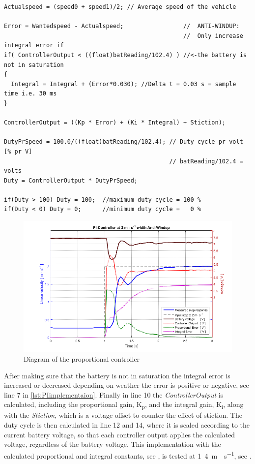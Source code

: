 %
\begin{lstlisting}
Actualspeed = (speed0 + speed1)/2; // Average speed of the vehicle

Error = Wantedspeed - Actualspeed;                 //  ANTI-WINDUP:
                                                   //  Only increase integral error if
if( ControllerOutput < ((float)batReading/102.4) ) //<-the battery is not in saturation
{
  Integral = Integral + (Error*0.030); //Delta t = 0.03 s = sample time i.e. 30 ms
}

ControllerOutput = ((Kp * Error) + (Ki * Integral) + Stiction);

DutyPrSpeed = 100.0/((float)batReading/102.4); // Duty cycle pr volt [% pr V]
                                               // batReading/102.4 = volts
Duty = ControllerOutput * DutyPrSpeed;

if(Duty > 100) Duty = 100;  //maximum duty cycle = 100 %
if(Duty < 0) Duty = 0;      //minimum duty cycle =   0 %
\end{lstlisting}
%
\begin{figure}[H]
 	\centering
 	\includegraphics[width=.8\textwidth]{figures/PIwidthAntiWindup}
 	\caption{Diagram of the proportional controller}
 	\label{fig:PIwithAntiWindup}
\end{figure}
%
After making sure that the battery is not in saturation the integral error is increased or decreased depending on weather the error is positive or negative, see line 7 in \autoref{lst:PIimplementaion}. Finally in line 10 the \emph{ControllerOutput} is calculated, including the proportional gain, \si{K_p}, and the integral gain, \si{K_i}, along with the \emph{Stiction}, which is a voltage offset to counter the effect of stiction.
The duty cycle is then calculated in line 12 and 14, where it is scaled according to the current battery voltage, so that each controller output applies the calculated voltage, regardless of the battery voltage. This implementation with the calculated proportional and integral constants, see , is tested at \si{1.4 m\cdot s^{-1}}, see .

